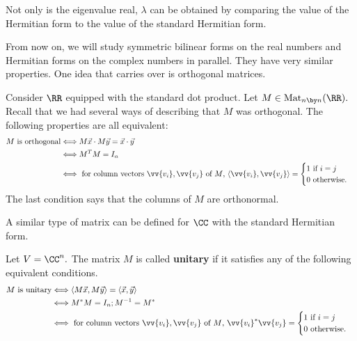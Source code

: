 %
Not only is the eigenvalue real, $\lambda$ can be obtained by comparing the value of the Hermitian form to the value of the standard Hermitian form. 

From now on, we will study symmetric bilinear forms on the real numbers and Hermitian forms on the complex numbers in parallel. They have very similar properties. 
One idea that carries over is orthogonal matrices.
\begin{example}
Consider $\RR$ equipped with the standard dot product. Let $M \in \text{Mat}_{n \by n}(\RR).$ Recall that we had several ways of describing that $M$ was orthogonal. The following properties are all equivalent:
\begin{align*}
    M \text{ is orthogonal} &\Longleftrightarrow M\vec{x} \cdot M\vec{y} = \vec{x} \cdot \vec{y} \\
    &\Longleftrightarrow M^TM = I_n \\
    &\Longleftrightarrow \text{ for column vectors $\vv{v_i}, \vv{v_j}$ of $M$, } 
    \langle \vv{v_i}, \vv{v_j} \rangle = \begin{cases} 1 \text { if $i=j$} \\ 0 \text{ otherwise}.\end{cases}
\end{align*}
The last condition says that the columns of $M$ are orthonormal.
\end{example}

A similar type of matrix can be defined for $\CC$ with the standard Hermitian form. 
\begin{definition}
Let $V = \CC^n.$ The matrix $M$ is called \textbf{unitary} if it satisfies any of the following equivalent conditions.
\begin{align*}
    M \text{ is unitary} &\Longleftrightarrow \langle M\vec{x}, M\vec{y} \rangle = \langle \vec{x}, \vec{y}\rangle \\
    &\Longleftrightarrow M^*M = I_n; M^{-1} = M^*\\
    &\Longleftrightarrow \text{ for column vectors $\vv{v_i}, \vv{v_j}$ of $M$, } 
    \vv{v_i}^*\vv{v_j} = \begin{cases} 1 \text { if $i=j$} \\ 0 \text{ otherwise}.\end{cases}
\end{align*}
\end{definition}

